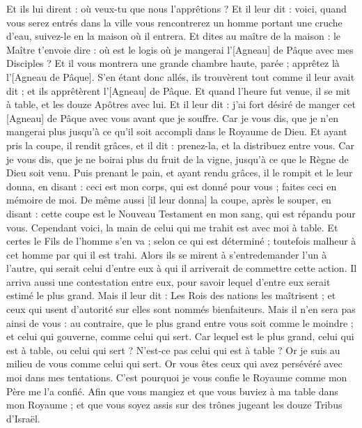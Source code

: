 \begin{multicols}{2}
Et ils lui dirent : où veux-tu que nous l'apprêtions ?
Et il leur dit : voici, quand vous serez entrés dans la ville vous rencontrerez un homme portant une cruche d'eau, suivez-le en la maison où il entrera.
Et dites au maître de la maison : le Maître t'envoie dire : où est le logis où je mangerai l'[Agneau] de Pâque avec mes Disciples ?
Et il vous montrera une grande chambre haute, parée ; apprêtez là l'[Agneau de Pâque].
S'en étant donc allés, ils trouvèrent tout comme il leur avait dit ; et ils apprêtèrent l'[Agneau] de Pâque.
Et quand l'heure fut venue, il se mit à table, et les douze Apôtres avec lui.
Et il leur dit : j'ai fort désiré de manger cet [Agneau] de Pâque avec vous avant que je souffre.
Car je vous dis, que je n'en mangerai plus jusqu'à ce qu'il soit accompli dans le Royaume de Dieu.
Et ayant pris la coupe, il rendit grâces, et il dit : prenez-la, et la distribuez entre vous.
Car je vous dis, que je ne boirai plus du fruit de la vigne, jusqu'à ce que le Règne de Dieu soit venu.
Puis prenant le pain, et ayant rendu grâces, il le rompit et le leur donna, en disant : ceci est mon corps, qui est donné pour vous ; faites ceci en mémoire de moi.
De même aussi [il leur donna] la coupe, après le souper, en disant : cette coupe est le Nouveau Testament en mon sang, qui est répandu pour vous.
Cependant voici, la main de celui qui me trahit est avec moi à table.
Et certes le Fils de l'homme s'en va ; selon ce qui est déterminé ; toutefois malheur à cet homme par qui il est trahi.
Alors ils se mirent à s'entredemander l'un à l'autre, qui serait celui d'entre eux à qui il arriverait de commettre cette action.
Il arriva aussi une contestation entre eux, pour savoir lequel d'entre eux serait estimé le plus grand.
Mais il leur dit : Les Rois des nations les maîtrisent ; et ceux qui usent d'autorité sur elles sont nommés bienfaiteurs.
Mais il n'en sera pas ainsi de vous : au contraire, que le plus grand entre vous soit comme le moindre ; et celui qui gouverne, comme celui qui sert.
Car lequel est le plus grand, celui qui est à table, ou celui qui sert ? N'est-ce pas celui qui est à table ? Or je suis au milieu de vous comme celui qui sert.
Or vous êtes ceux qui avez persévéré avec moi dans mes tentations.
C'est pourquoi je vous confie le Royaume comme mon Père me l'a confié.
Afin que vous mangiez et que vous buviez à ma table dans mon Royaume ; et que vous soyez assis sur des trônes jugeant les douze Tribus d'Israël.

\end{multicols}
